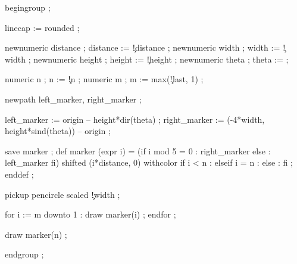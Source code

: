 


  begingroup ;

  linecap := rounded ;

  newnumeric distance  ; distance  := \visualcounterparameter\c!distance ;
  newnumeric width     ; width     := \visualcounterparameter\c!width ;
  newnumeric height    ; height    := \visualcounterparameter\c!height ;
  newnumeric theta     ; theta     :=  ;

  numeric n ; n := \visualcounterparameter\c!n ;
  numeric m ; m := max(\visualcounterparameter\c!last, 1) ;


  newpath left_marker, right_marker ;

  left_marker   := origin -- height*dir(theta) ;
  right_marker  := (-4*width, height*sind(theta)) -- origin ;

  save marker ;
  def marker (expr i) =
    (if i mod 5 = 0 : right_marker else : left_marker fi) 
        shifted (i*distance, 0) 
        withcolor
            if i < n     :  
            elseif i = n : 
            else         : 
            fi ;
  enddef ;

  pickup pencircle scaled \visualcounterparameter\c!width ;

  for i := m downto 1 :
      draw marker(i) ;
  endfor ;

  draw marker(n) ;

  endgroup ;
\stopuseMPgraphic




